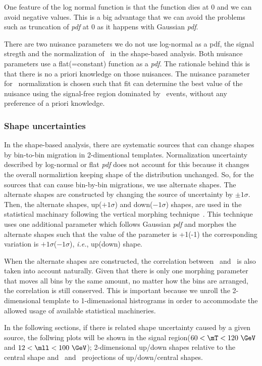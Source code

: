 One feature of the log normal function is that the function dies at 0
and we can avoid negative values. This is a big advantage that we can avoid 
the problems such as truncation of \textit{pdf} at 0 as it happens with Gaussian \textit{pdf}.    

There are two nuisance parameters we do not use log-normal as a pdf, 
the signal stregth and the normalization of \qqww\ in the shape-based analysis. 
Both nuisance parameters use a flat(=constant) function as a \textit{pdf}.  
The rationale behind this is that there is no a priori knowledge on those 
nuisances. The nuisance parameter for \qqww\ normalization is chosen 
such that fit can determine the best value of the nuisance using 
the signal-free region dominated by \qqww\ events, without any preference 
of a priori knowledge. 

\subsubsection{Shape uncertainties}

In the shape-based analysis, there are systematic sources that can change shapes 
by bin-to-bin migration in 2-dimentional templates. 
Normalization uncertainty described by log-normal or flat \textit{pdf}  
does not account for this because it changes the overall normaliztion 
keeping shape of the distribution unchanged. So, for the sources that can cause 
bin-by-bin migrations, we use alternate shapes.  
The alternate shapes are constructed by changing the source of uncertainty 
by $\pm 1\sigma$. Then, the alternate shapes, up($+1\sigma$) and down($-1\sigma$) shapes,
are used in the statistical machinary following the vertical morphing technique~\cite{}. 
This technique uses one additional parameter which follows Gaussian \textit{pdf}
and morphes the alternate shapes such that the value of the parameter 
is +1(-1) the corresponding variation is $+1\sigma$($-1\sigma$), 
\textit{i.e.}, up(down) shape. 

When the alternate shapes are constructed, 
the correlation between \mT\ and \mll\ is also taken into account naturally.  
Given that there is only one morphing parameter that moves all bins 
by the same amount,  
no matter how the bins are arranged, the correlation is still conserved.  
This is important because we unroll the 2-dimensional template to 1-dimenasional 
histrograms in order to accommodate the allowed usage of available statistical 
machineries. 

In the following sections, if there is related shape uncertainty
caused by a given source, the follwing plots will be shown in the
signal region($60<\mT<120~\GeV$ and $12<\mll<100~\GeV$); 
2-dimensional up/down shapes relative to the central shape 
and \mT\ and \mll\ projections of up/down/central shapes. 

